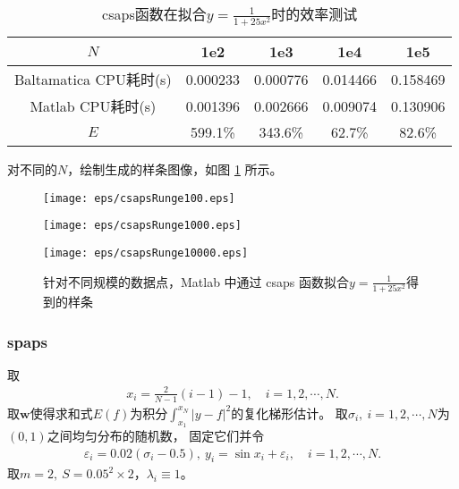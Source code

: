 \begin{table}[htbp]
  \centering
  \caption{\label{tab:FINALcsapsRungetime}csaps函数在拟合$y=\frac{1}{1+25x^{2}}$时的效率测试}
  \begin{tabular}{ccccc}
    \hline
    $N$&1e2&1e3&1e4&1e5\\
    \hline
    Baltamatica CPU耗时(s)&0.000233&0.000776& 0.014466 &0.158469\\
    Matlab CPU耗时(s)&0.001396&0.002666&0.009074&0.130906\\
    $E$&599.1\%&343.6\%&62.7\%&82.6\%\\
    \hline
  \end{tabular}
\end{table}
对不同的$N$，绘制生成的样条图像，如图 \ref{fig:FINALcsapsRunge} 所示。

\begin{figure}[h]  
  \centering   
  \begin{minipage}{0.3\textwidth}  
    \centering  
    \texttt{[image: eps/csapsRunge100.eps]}  
    \caption*{$N=100$}  
  \end{minipage}  
  \hfill  
  \begin{minipage}{0.3\textwidth}  
    \centering  
    \texttt{[image: eps/csapsRunge1000.eps]}  
    \caption*{$N=1000$}  
  \end{minipage}
  \hfill  
  \begin{minipage}{0.3\textwidth}  
    \centering  
    \texttt{[image: eps/csapsRunge10000.eps]}  
    \caption*{$N=10000$}  
  \end{minipage}   
  \caption{针对不同规模的数据点，Matlab 中通过 csaps 函数拟合$y=\frac{1}{1+25x^{2}}$得到的样条}
  \label{fig:FINALcsapsRunge}  
\end{figure}

\subsubsection{spaps}
\label{subsubsec:spapsRunge}
取
\begin{align*}
  x_{i}=\frac{2}{N-1} (i-1)-1,
 \quad i=1,2,\cdots,N.
\end{align*}
取$\mathbf{w}$使得求和式$E(f)$为积分$\int_{x_{1}}^{x_{N}}|y-f|^{2}$的复化梯形估计。
取$\sigma_{i},\ i=1,2,\cdots,N$为$(0,1)$之间均匀分布的随机数，
固定它们并令
\begin{align*}
  \varepsilon_{i}=0.02(\sigma_{i}-0.5),\
  y_{i}=\sin x_{i}+\varepsilon_{i},\quad i=1,2,\cdots,N.
\end{align*}
取$m=2,\ S=0.05^{2}\times2$，$\lambda_{i}\equiv1$。

